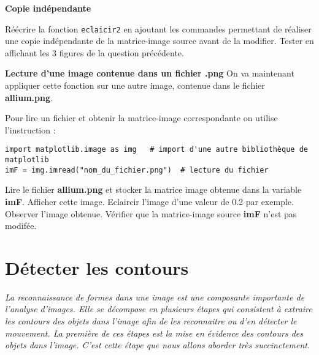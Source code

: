\textbf{Copie indépendante}

\begin{question}
Réécrire la fonction \lstinline{eclaicir2} en ajoutant les commandes permettant de réaliser une copie indépendante de la matrice-image source avant de la modifier. Tester en affichant les 3 figures de la question précédente.
\end{question}


\textbf{Lecture d'une image contenue dans un fichier .png}
On va maintenant appliquer cette fonction sur une autre image, contenue dans le fichier \textbf{allium.png}.

Pour lire un fichier et obtenir la matrice-image correspondante on utilise l'instruction :
\begin{lstlisting}
import matplotlib.image as img   # import d'une autre bibliothèque de matplotlib
imF = img.imread("nom_du_fichier.png")  # lecture du fichier
\end{lstlisting}


 
\begin{question}
Lire le fichier \textbf{allium.png} et stocker la matrice image obtenue dans la variable \textbf{imF}. Afficher cette image. Eclaircir l'image d'une valeur de 0.2 par exemple. Observer l'image obtenue. Vérifier que la matrice-image source \textbf{imF} n'est pas modifée. 
\end{question}



\section*{Détecter les contours}

\textit{La reconnaissance de formes dans une image est une composante importante de l'analyse d'images.
Elle se décompose en plusieurs étapes qui consistent à extraire les contours des objets dans l'image afin
de les reconnaitre ou d'en détecter le mouvement. La première de ces étapes est la mise en évidence
des contours des objets dans l'image. C'est cette étape que nous allons aborder très succinctement.}
\\

